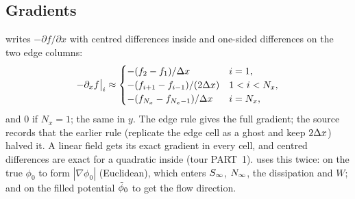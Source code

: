 \subsection{Gradients}\label{disc:gradients}
 writes $-\partial f/\partial x$ with centred differences inside and one-sided differences on
the two edge columns:
\begin{equation}
-\partial_x f\big|_{i} \approx \begin{cases} -(f_{2}-f_{1})/\Delta x & i = 1,\\ -(f_{i+1}-f_{i-1})/(2\Delta x) & 1<i<N_x,\\
-(f_{N_x}-f_{N_x-1})/\Delta x & i = N_x,\end{cases}
\end{equation}
and 0 if $N_x = 1$; the same in $y$. The edge rule gives the full gradient; the source records that the earlier
rule (replicate the edge cell as a ghost and keep $2\Delta x$) halved it. A linear field gets its exact gradient in every
cell, and centred differences are exact for a quadratic inside (tour PART~1). 
uses this twice: on the true $\phi_0$ to form $|\nabla\phi_0|$ (Euclidean), which enters ${S_\infty}$, ${N_\infty}$, the
dissipation and $W$; and on the filled potential ${\tilde\phi_0}$ to get the flow direction.

